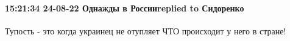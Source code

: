  
 
 
 
 

\paragraph{15:21:34 24-08-22 Однажды в Россииreplied to Сидоренко}

Тупость - это когда украинец не отупляет ЧТО происходит у него в стране!
